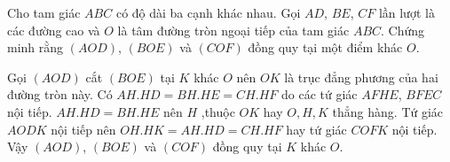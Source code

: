 \begin{prob}
	Cho tam giác $ABC$ có độ dài ba cạnh khác nhau. Gọi $AD$, $BE$, $CF$ lần lượt là các đường cao và $O$ là tâm đường tròn ngoại tiếp của tam giác $ABC$. Chứng minh rằng $(AOD)$, $(BOE)$ và $(COF)$ đồng quy tại một điểm khác $O$.
\end{prob}

\begin{center}

\end{center}

Gọi $(AOD)$ cắt $(BOE)$ tại $K$ khác $O$ nên $OK$ là trục đẳng phương của hai đường tròn này. Có $AH.HD = BH.HE = CH.HF$ do các tứ giác $AFHE$, $BFEC$ nội tiếp. $AH.HD = BH.HE$ nên $H$ ,thuộc $OK$ hay $O, H, K$ thẳng hàng. Tứ giác $AODK$ nội tiếp nên $OH.HK = AH.HD = CH.HF$ hay tứ giác $COFK$ nội tiếp. Vậy $(AOD)$, $(BOE)$ và $(COF)$ đồng quy tại $K$ khác $O$. 